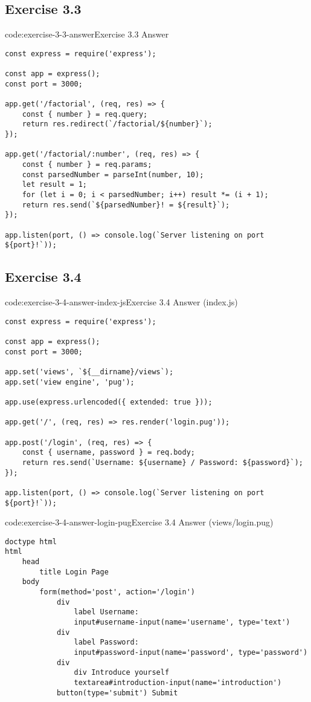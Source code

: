 \subsection*{Exercise 3.3}

\begin{codeenv}{code:exercise-3-3-answer}{Exercise 3.3 Answer}\begin{verbatim}
const express = require('express');

const app = express();
const port = 3000;

app.get('/factorial', (req, res) => {
    const { number } = req.query;
    return res.redirect(`/factorial/${number}`);
});

app.get('/factorial/:number', (req, res) => {
    const { number } = req.params;
    const parsedNumber = parseInt(number, 10);
    let result = 1;
    for (let i = 0; i < parsedNumber; i++) result *= (i + 1);
    return res.send(`${parsedNumber}! = ${result}`);
});

app.listen(port, () => console.log(`Server listening on port ${port}!`));    
\end{verbatim}
\end{codeenv}

\subsection*{Exercise 3.4}

\begin{codeenv}{code:exercise-3-4-answer-index-js}{Exercise 3.4 Answer (index.js)}\begin{verbatim}
const express = require('express');

const app = express();
const port = 3000;

app.set('views', `${__dirname}/views`);
app.set('view engine', 'pug');

app.use(express.urlencoded({ extended: true }));

app.get('/', (req, res) => res.render('login.pug'));

app.post('/login', (req, res) => {
    const { username, password } = req.body;
    return res.send(`Username: ${username} / Password: ${password}`);
});

app.listen(port, () => console.log(`Server listening on port ${port}!`));
\end{verbatim}
\end{codeenv}

\begin{codeenv}{code:exercise-3-4-answer-login-pug}{Exercise 3.4 Answer (views/login.pug)}\begin{verbatim}
doctype html
html
    head
        title Login Page
    body
        form(method='post', action='/login')
            div
                label Username:
                input#username-input(name='username', type='text')
            div
                label Password:
                input#password-input(name='password', type='password')
            div
                div Introduce yourself
                textarea#introduction-input(name='introduction')
            button(type='submit') Submit
\end{verbatim}
\end{codeenv}
